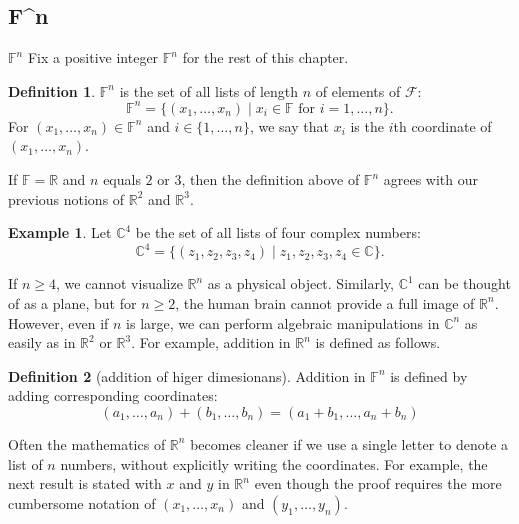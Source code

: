 \documentclass[
]{book}
\theoremstyle{definition}
\newtheorem{definition}{Definition}[chapter]
\theoremstyle{definition}
\newtheorem{example}{Example}[chapter]
\theoremstyle{definition}
\theoremstyle{definition}
\theoremstyle{remark}
\begin{document}
\subsection{F\^{}n}\label{fn}

\(\mathbb{F}^n\)
Fix a positive integer \(\mathbb{F}^n\) for the rest of this chapter.

\begin{definition}
\protect\hypertarget{def:unnamed-chunk-9}{}\label{def:unnamed-chunk-9}\(\mathbb{F}^n\) is the set of all lists of length \(n\) of elements of \(\mathcal{F}\):
\[\mathbb{F}^n = \{(x_1, \ldots, x_n) \mid x_i \in \mathbb{F} \text{ for } i = 1, \ldots, n\}.\]
For \((x_1, \ldots, x_n) \in \mathbb{F}^n\) and \(i \in \{1, \ldots, n\}\), we say that \(x_i\) is the \(i\)th coordinate of \((x_1, \ldots, x_n)\).
\end{definition}

If \(\mathbb{F}=\mathbb{R}\) and \(n\) equals \(2\) or \(3\), then the definition above of \(\mathbb{F}^n\) agrees with our previous notions of \(\mathbb{R}^2\) and \(\mathbb{R}^3\).

\begin{example}
\protect\hypertarget{exm:unnamed-chunk-10}{}\label{exm:unnamed-chunk-10}Let \(\mathbb{C}^4\) be the set of all lists of four complex numbers:
\[\mathbb{C}^4 = \{(z_1, z_2, z_3, z_4) \mid z_1, z_2, z_3, z_4 \in \mathbb{C}\}.\]
\end{example}

If \(n \geq 4\), we cannot visualize \(\mathbb{R}^n\) as a physical object. Similarly, \(\mathbb{C}^1\) can be thought of as a plane, but for \(n \geq 2\), the human brain cannot provide a full image of \(\mathbb{R}^n\). However, even if \(n\) is large, we can perform algebraic manipulations in \(\mathbb{C}^n\) as easily as in \(\mathbb{R}^2\) or \(\mathbb{R}^3\). For example, addition in \(\mathbb{R}^n\) is defined as follows.

\begin{definition}[addition of higer dimesionans]
\protect\hypertarget{def:unnamed-chunk-11}{}\label{def:unnamed-chunk-11}Addition in \(\mathbb{F}^n\) is defined by adding corresponding coordinates:\[
(a_1, …, a_n) + (b_1, …, b_n) = (a_1 + b_1, …, a_n + b_n)
\]
\end{definition}

Often the mathematics of \(\mathbb{R}^n\) becomes cleaner if we use a single letter to denote a list of \(n\) numbers, without explicitly writing the coordinates. For example, the next result is stated with \(x\) and \(y\) in \(\mathbb{R}^n\) even though the proof requires the more cumbersome notation of \((x_1, \ldots, x_n)\) and \((y_1, \ldots, y_n)\).
\end{document}
